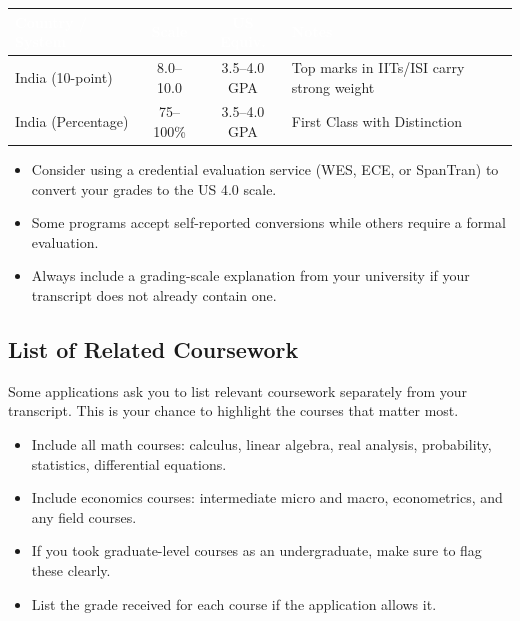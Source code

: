 \documentclass[11pt, letterpaper]{article}
\begin{document}
\vspace{6pt}
\begin{center}
\small
\renewcommand{\arraystretch}{1.4}
\begin{tabular}{>{\raggedright\arraybackslash}p{3cm} c c >{\raggedright\arraybackslash}p{4cm}}
\toprule
\rowcolor{ctabhead} \textcolor{white}{\textbf{Country / System}} & \textcolor{white}{\textbf{Scale}} & \textcolor{white}{\textbf{US Equiv.}} & \textcolor{white}{\textbf{Notes}} \\
\midrule
India (10-point)     & 8.0--10.0    & 3.5--4.0 GPA & Top marks in IITs/ISI carry strong weight \\
India (Percentage)   & 75--100\%    & 3.5--4.0 GPA & First Class with Distinction \\
\bottomrule
\end{tabular}
\end{center}
\vspace{6pt}

\begin{itemize}[leftmargin=*, itemsep=2pt]
    \item Consider using a credential evaluation service (WES, ECE, or SpanTran) to convert your grades to the US 4.0 scale.
    \item Some programs accept self-reported conversions while others require a formal evaluation.
    \item Always include a grading-scale explanation from your university if your transcript does not already contain one.
\end{itemize}


\subsection{List of Related Coursework}\label{sec:coursework}

Some applications ask you to list relevant coursework separately from your transcript. This is your chance to highlight the courses that matter most.

\begin{itemize}[leftmargin=*, itemsep=2pt]
    \item Include all math courses: calculus, linear algebra, real analysis, probability, statistics, differential equations.
    \item Include economics courses: intermediate micro and macro, econometrics, and any field courses.
    \item If you took graduate-level courses as an undergraduate, make sure to flag these clearly.
    \item List the grade received for each course if the application allows it.
\end{itemize}
\end{document}
